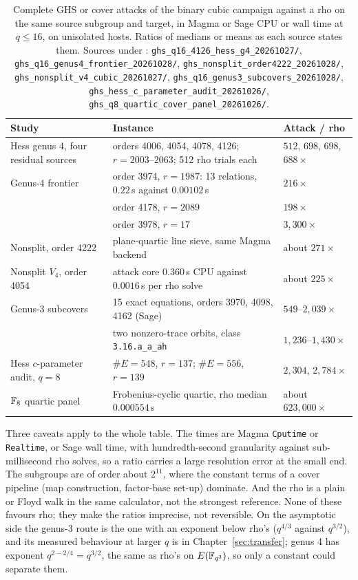 \begin{table}[t]
\centering\small
\begin{tabularx}{\linewidth}{@{}>{\raggedright}p{4.1cm}>{\raggedright}X>{\raggedright\arraybackslash}p{2.6cm}@{}}
\toprule
Study & Instance & Attack / rho \\
\midrule
Hess genus 4, four residual sources & orders 4006, 4054, 4078, 4126; $r=2003$--$2063$; 512 rho trials each & $512$, $698$, $698$, $688\times$ \\
Genus-4 frontier & order 3974, $r=1987$: 13 relations, $0.22$\,s against $0.00102$\,s & $216\times$ \\
 & order 4178, $r=2089$ & $198\times$ \\
 & order 3978, $r=17$ & $3{,}300\times$ \\
Nonsplit, order 4222 & plane-quartic line sieve, same Magma backend & about $271\times$ \\
Nonsplit $V_4$, order 4054 & attack core $0.360$\,s CPU against $0.0016$\,s per rho solve & about $225\times$ \\
Genus-3 subcovers & 15 exact equations, orders 3970, 4098, 4162 (Sage) & $549$--$2{,}039\times$ \\
 & two nonzero-trace orbits, class \texttt{3.16.a\_a\_ah} & $1{,}236$--$1{,}430\times$ \\
Hess $c$-parameter audit, $q=8$ & $\#E=548$, $r=137$; $\#E=556$, $r=139$ & $2{,}304$, $2{,}784\times$ \\
$\mathbb{F}_8$ quartic panel & Frobenius-cyclic quartic, rho median $0.000554$\,s & about $623{,}000\times$ \\
\bottomrule
\end{tabularx}
\caption[]{Complete GHS or cover attacks of the binary cubic campaign
against a rho on the same source subgroup and target, in Magma or Sage CPU
or wall time at $q\le16$, on unisolated hosts. Ratios of medians or means as each
source states them. Sources under :
\texttt{ghs\_q16\_4126\_hess\_g4\_20261027/},
\texttt{ghs\_q16\_genus4\_frontier\_20261028/},
\texttt{ghs\_nonsplit\_order4222\_20261028/},
\texttt{ghs\_nonsplit\_v4\_cubic\_20261027/},
\texttt{ghs\_q16\_genus3\_subcovers\_20261028/},
\texttt{ghs\_hess\_c\_parameter\_audit\_20261026/},
\texttt{ghs\_q8\_quartic\_cover\_panel\_20261026/}.}
\label{tab:ghs-e2e}
\end{table}

Three caveats apply to the whole table. The times are Magma
\texttt{Cputime} or \texttt{Realtime}, or Sage wall time, with hundredth-second granularity
against sub-millisecond rho solves, so a ratio carries a large resolution
error at the small end. The subgroups are of order about $2^{11}$, where
the constant terms of a cover pipeline (map construction, factor-base
set-up) dominate. And the rho is a plain or Floyd walk in the same
calculator, not the strongest reference. None of these favours rho; they
make the ratios imprecise, not reversible. On the asymptotic side the
genus-3 route is the one with an exponent below rho's ($q^{4/3}$ against
$q^{3/2}$), and its measured behaviour at larger $q$ is in
Chapter~\ref{sec:transfer}; genus 4 has exponent $q^{2-2/4}=q^{3/2}$, the
same as rho's on $E(\mathbb{F}_{q^3})$, so only a constant could separate them.

